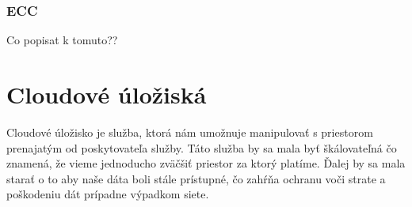 	\subsubsection{ECC}
		Co popisat k tomuto?? 
		
\section{Cloudové úložiská}
	Cloudové úložisko je služba, ktorá nám umožnuje manipulovať s priestorom prenajatým od poskytovateľa služby. Táto služba by sa mala byť škálovateľná čo znamená, že vieme jednoducho zväčšiť priestor za ktorý platíme. Ďalej by sa mala starať o to aby naše dáta boli stále prístupné, čo zahŕňa ochranu voči strate a poškodeniu dát prípadne výpadkom siete. 